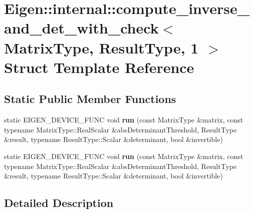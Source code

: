 \hypertarget{struct_eigen_1_1internal_1_1compute__inverse__and__det__with__check_3_01_matrix_type_00_01_result_type_00_011_01_4}{}\section{Eigen\+:\+:internal\+:\+:compute\+\_\+inverse\+\_\+and\+\_\+det\+\_\+with\+\_\+check$<$ Matrix\+Type, Result\+Type, 1 $>$ Struct Template Reference}
\label{struct_eigen_1_1internal_1_1compute__inverse__and__det__with__check_3_01_matrix_type_00_01_result_type_00_011_01_4}
\subsection*{Static Public Member Functions}
\begin{DoxyCompactItemize}
\item 
\mbox{\label{struct_eigen_1_1internal_1_1compute__inverse__and__det__with__check_3_01_matrix_type_00_01_result_type_00_011_01_4_af65bd555cb7b2aa48208364a4beea8be}} 
static E\+I\+G\+E\+N\+\_\+\+D\+E\+V\+I\+C\+E\+\_\+\+F\+U\+NC void {\bfseries run} (const Matrix\+Type \&matrix, const typename Matrix\+Type\+::\+Real\+Scalar \&abs\+Determinant\+Threshold, Result\+Type \&result, typename Result\+Type\+::\+Scalar \&determinant, bool \&invertible)
\item 
\mbox{\label{struct_eigen_1_1internal_1_1compute__inverse__and__det__with__check_3_01_matrix_type_00_01_result_type_00_011_01_4_af65bd555cb7b2aa48208364a4beea8be}} 
static E\+I\+G\+E\+N\+\_\+\+D\+E\+V\+I\+C\+E\+\_\+\+F\+U\+NC void {\bfseries run} (const Matrix\+Type \&matrix, const typename Matrix\+Type\+::\+Real\+Scalar \&abs\+Determinant\+Threshold, Result\+Type \&result, typename Result\+Type\+::\+Scalar \&determinant, bool \&invertible)
\end{DoxyCompactItemize}


\subsection{Detailed Description}
